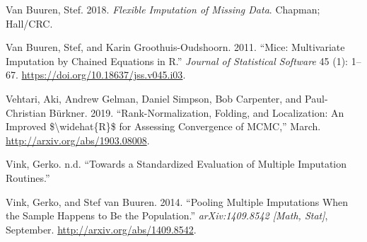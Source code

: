 \documentclass[
  Royal, times, sageapa]{sagej}
\begin{document}
\leavevmode\hypertarget{ref-buur18}{}%
Van Buuren, Stef. 2018. \emph{Flexible Imputation of Missing Data}.
Chapman; Hall/CRC.

\leavevmode\hypertarget{ref-mice}{}%
Van Buuren, Stef, and Karin Groothuis-Oudshoorn. 2011. ``Mice:
Multivariate Imputation by Chained Equations in R.'' \emph{Journal of
Statistical Software} 45 (1): 1--67.
\url{https://doi.org/10.18637/jss.v045.i03}.

\leavevmode\hypertarget{ref-veht19}{}%
Vehtari, Aki, Andrew Gelman, Daniel Simpson, Bob Carpenter, and
Paul-Christian Bürkner. 2019. ``Rank-Normalization, Folding, and
Localization: An Improved \$\textbackslash widehat\{R\}\$ for Assessing
Convergence of MCMC,'' March. \url{http://arxiv.org/abs/1903.08008}.

\leavevmode\hypertarget{ref-vinknd}{}%
Vink, Gerko. n.d. ``Towards a Standardized Evaluation of Multiple
Imputation Routines.''

\leavevmode\hypertarget{ref-vink14}{}%
Vink, Gerko, and Stef van Buuren. 2014. ``Pooling Multiple Imputations
When the Sample Happens to Be the Population.'' \emph{arXiv:1409.8542
{[}Math, Stat{]}}, September. \url{http://arxiv.org/abs/1409.8542}.
\end{document}

